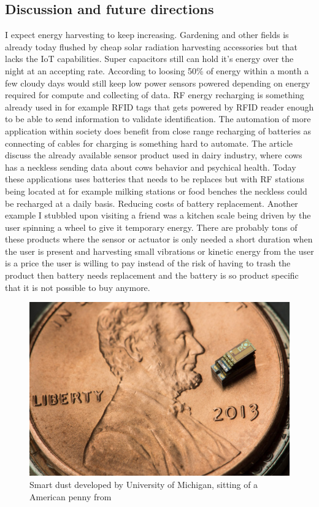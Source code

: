 \documentclass[article,a4paper]{IEEEtran}
\begin{document}
\subsection{Discussion and future directions}
I expect energy harvesting to keep increasing. Gardening and other fields is already today flushed by cheap solar radiation harvesting accessories but that lacks the IoT capabilities. Super capacitors still can hold it's energy over the night at an accepting rate. According to \cite{RF_energy_harvest} loosing 50\% of energy within a month a few cloudy days would still keep low power sensors powered depending on energy required for compute and collecting of data. 
\newline\newline
RF energy recharging is something already used in for example RFID tags that gets powered by RFID reader enough to be able to send information to validate identification. The automation of more application within society does benefit from close range recharging of batteries as connecting of cables for charging is something hard to automate. The article \cite{Master_ambient_rf} discuss the already available sensor product used in dairy industry, where cows has a neckless sending data about cows behavior and psychical health. Today these applications uses batteries that needs to be replaces but with RF stations being located at for example milking stations or food benches the neckless could be recharged at a daily basis. Reducing costs of battery replacement. 
\newline\newline
Another example I stubbled upon visiting a friend was a kitchen scale being driven by the user spinning a wheel to give it temporary energy\cite{Kitchen_scale}. There are probably tons of these products where the sensor or actuator is only needed a short duration when the user is present and harvesting small vibrations or kinetic energy from the user is a price the user is willing to pay instead of the risk of having to trash the product then battery needs replacement and the battery is so product specific that it is not possible to buy anymore. 
\begin{figure}
    \includegraphics[width=\columnwidth]{Smartdust.png}
    \caption{ Smart dust developed by University of Michigan, sitting of a American penny from \cite{RF_energy_harvest} }
    \label{fig5_smart_dust}
\end{figure}
\end{document}
